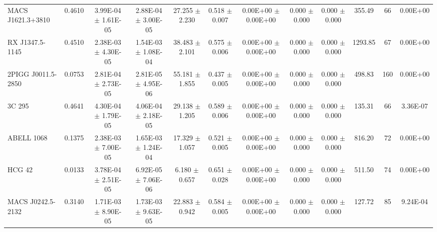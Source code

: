 \documentclass{article}
\begin{document}
\begin{landscape}
\begin{center}
\begin{longtable}{lccccccccccc}
MACS J1621.3+3810   \dotfill &  0.4610     &     3.99E-04  $\pm$    1.61E-05     &     2.88E-04  $\pm$    3.00E-05     &       27.255  $\pm$       2.230     &        0.518  $\pm$       0.007     &     0.00E+00  $\pm$    0.00E+00     &        0.000  $\pm$       0.000     &        0.000  $\pm$       0.000     &   355.49 &    66 &     0.00E+00\\
RX J1347.5-1145     \dotfill &  0.4510     &     2.38E-03  $\pm$    4.30E-05     &     1.54E-03  $\pm$    1.08E-04     &       38.483  $\pm$       2.101     &        0.575  $\pm$       0.006     &     0.00E+00  $\pm$    0.00E+00     &        0.000  $\pm$       0.000     &        0.000  $\pm$       0.000     &  1293.85 &    67 &     0.00E+00\\
2PIGG J0011.5-2850  \dotfill &  0.0753     &     2.81E-04  $\pm$    2.73E-05     &     2.81E-05  $\pm$    4.95E-06     &       55.181  $\pm$       1.855     &        0.437  $\pm$       0.005     &     0.00E+00  $\pm$    0.00E+00     &        0.000  $\pm$       0.000     &        0.000  $\pm$       0.000     &   498.83 &   160 &     0.00E+00\\
3C 295              \dotfill &  0.4641     &     4.30E-04  $\pm$    1.79E-05     &     4.06E-04  $\pm$    2.18E-05     &       29.138  $\pm$       1.205     &        0.589  $\pm$       0.006     &     0.00E+00  $\pm$    0.00E+00     &        0.000  $\pm$       0.000     &        0.000  $\pm$       0.000     &   135.31 &    66 &     3.36E-07\\
ABELL 1068          \dotfill &  0.1375     &     2.38E-03  $\pm$    7.00E-05     &     1.65E-03  $\pm$    1.24E-04     &       17.329  $\pm$       1.057     &        0.521  $\pm$       0.005     &     0.00E+00  $\pm$    0.00E+00     &        0.000  $\pm$       0.000     &        0.000  $\pm$       0.000     &   816.20 &    72 &     0.00E+00\\
HCG 42              \dotfill &  0.0133     &     3.78E-04  $\pm$    2.51E-05     &     6.92E-05  $\pm$    7.06E-06     &        6.180  $\pm$       0.657     &        0.651  $\pm$       0.028     &     0.00E+00  $\pm$    0.00E+00     &        0.000  $\pm$       0.000     &        0.000  $\pm$       0.000     &   511.50 &    74 &     0.00E+00\\
MACS J0242.5-2132   \dotfill &  0.3140     &     1.71E-03  $\pm$    8.90E-05     &     1.73E-03  $\pm$    9.63E-05     &       22.883  $\pm$       0.942     &        0.584  $\pm$       0.005     &     0.00E+00  $\pm$    0.00E+00     &        0.000  $\pm$       0.000     &        0.000  $\pm$       0.000     &   127.72 &    85 &     9.24E-04\\

\end{longtable}
\end{center}
\end{landscape}
\end{document}
